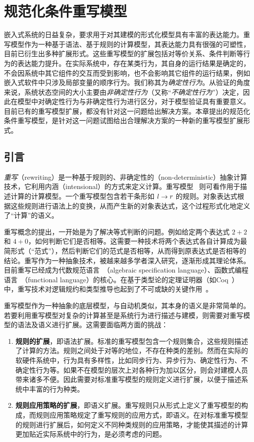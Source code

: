 \chapter{规范化条件重写模型}
\label{cha:normalrewriting} 

嵌入式系统的日益复杂，要求用于对其建模的形式化模型具有丰富的表达能力。重写模型作为一种基于语法、基于规则的计算模型，其表达能力具有很强的可塑性，目前已衍生出多种扩展形式。这些重写模型的扩展包括对等价关系、条件判断等行为的表达能力提升。在实际系统中，存在某类行为，其自身的运行结果是确定的，不会因系统中其它组件的交互而受到影响，也不会影响其它组件的运行结果，例如嵌入式软件中只涉及局部变量的顺序行为。我们称其为\emph{确定性行为}。从验证的角度来说，系统状态空间的大小主要由\emph{非确定性行为}（又称“\emph{不确定性行为}”）决定，因此在模型中对确定性行为与非确定性行为进行区分，对于模型验证具有重要意义。目前已有的重写模型扩展，都没有针对这一问题给出解决方案。本章提出的规范化条件重写模型，是针对这一问题试图给出合理解决方案的一种新的重写模型扩展形式。

\section{引言}

\emph{重写}（rewriting）是一种基于规则的、非确定性的（non-deterministic）抽象计算技术，它利用内涵（intensional）的方式来定义计算。重写模型~\cite{DBLP:books/el/leeuwen90/DershowitzJ90,terese} 则可看作用于描述计算的计算模型。一个重写模型包含若干条形如 $l\rightarrow r$ 的规则。对象表达式根据这些规则进行语法上的变换，从而产生新的对象表达式，这个过程形式化地定义了“计算”的语义。

重写概念的提出，一开始是为了解决等式判断的问题。例如给定两个表达式 $2+2$ 和 $4+0$，如何判断它们是否相等。这需要一种技术将两个表达式各自计算成为最简形式（“范式”），然后判断它们的范式是否相等，从而得到原表达式是否相等的结论。重写作为一种抽象技术，被越来越多学者深入研究，逐渐形成其理论体系。目前重写已经成为代数规范语言~\cite{DBLP:conf/lics/JouannaudO91}（algebraic specification language）、函数式编程语言~\cite{DBLP:journals/cj/Hughes89}（functional language）的核心。在基于类型论的定理证明器（如Coq~\cite{DBLP:series/txtcs/BertotC04}）中，重写技术对逻辑规约和类型推导也起到了不可或缺的关键作用~\cite{assaf16a}。

重写模型作为一种抽象的底层模型，与自动机类似，其本身的语义是非常简单的。若要利用重写模型对复杂的计算甚至是系统行为进行描述与建模，则需要对重写模型的语法及语义进行扩展。这需要面临两方面的挑战：
\begin{enumerate}
\item \textbf{规则的扩展}，即语法扩展。标准的重写模型包含一个规则集合，这些规则描述了计算的方法。规则之间处于对等的地位，不存在种类的差别。然而在实际的软硬件系统中，行为具有多样性，比如同步行为、异步行为、确定性行为、不确定性行为等。如果不在模型的层次上对各种行为加以区分，则会对建模人员带来诸多不便。因此需要对标准重写模型的规则定义进行扩展，以便于描述系统中丰富的行为种类。
\item \textbf{规则应用策略的扩展}，即语义扩展。重写规则只从形式上定义了重写模型的构成，而规则应用策略规定了重写规则的应用方式，即语义。在对标准重写模型的规则进行扩展后，如何定义不同种类规则的应用策略，才能使其描述的计算更加贴近实际系统中的行为，是必须考虑的问题。
\end{enumerate}

